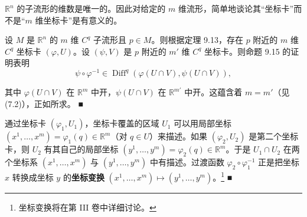 
\begin{remark}

\begin{items}
\item

$ \mathbb{R}^{n} $ 的子流形的维数是唯一的。因此对给定的 $ m $ 维流形，简单地谈论其“坐标卡”而不是“$ m $ 维坐标卡”是有意义的。

\proofhead
设 $ M $ 是 $ \mathbb{R}^{n} $ 的 $ m $ 维 $ C^{q} $ 子流形且 $ p \in M $。则根据定理 9.13，存在 $ p $ 附近的 $ m $ 维 $ C^{q} $ 坐标卡 $ (\varphi, U) $。设 $ (\psi, V) $ 是 $ p $ 附近的 $ m' $ 维 $ C^{q} $ 坐标卡。则命题 9.15 的证明表明
\[
\psi \circ \varphi^{-1} \in \operatorname{Diff}^{q}\left(\varphi(U \cap V), \psi(U \cap V)\right) ,
\]

其中 $ \varphi(U \cap V) $ 在 $ \mathbb{R}^{m} $ 中开，$ \psi(U \cap V) $ 在 $ \mathbb{R}^{m'} $ 中开。这蕴含着 $ m = m' $（见 (7.2)），正如所求。 \nobreak\hspace{0.35em}■

\item

通过坐标卡 $ (\varphi_{1}, U_{1}) $，坐标卡覆盖的区域 $ U_{1} $ 可以用局部坐标 $ (x^{1}, \ldots, x^{m}) = \varphi_{1}(q) \in \mathbb{R}^{m} $（对 $ q \in U $）来描述。如果 $ (\varphi_{2}, U_{2}) $ 是第二个坐标卡，则 $ U_{2} $ 有其自己的局部坐标 $ (y^{1}, \ldots, y^{m}) = \varphi_{2}(q) \in \mathbb{R}^{m} $。于是 $ U_{1} \cap U_{2} $ 在两个坐标系 $ (x^{1}, \ldots, x^{m}) $ 与 $ (y^{1}, \ldots, y^{m}) $ 中有描述。过渡函数 $ \varphi_{2} \circ \varphi_{1}^{-1} $ 正是把坐标 $ x $ 转换成坐标 $ y $ 的\textbf{坐标变换} $ (x^{1}, \ldots, x^{m}) \mapsto (y^{1}, \ldots, y^{m}) $。\footnote{坐标变换将在第 III 卷中详细讨论。} \nobreak\hspace{0.35em}■

\end{items}

\end{remark}

\exerciseshead

